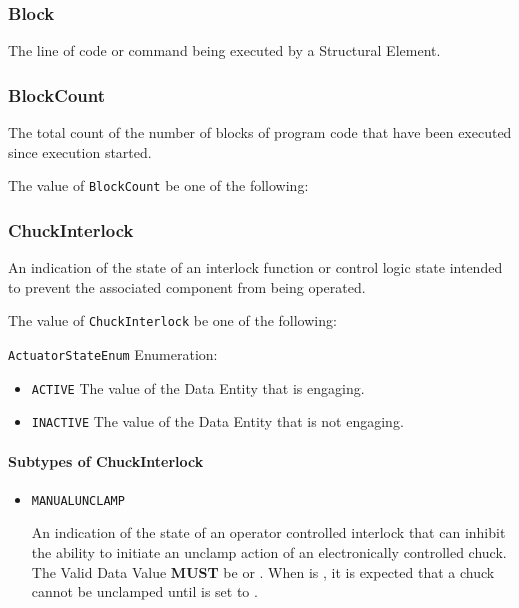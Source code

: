 \subsubsection{Block}
\label{sec:Block}



The line of code or command being executed by a  \gls{Structural Element}.


\subsubsection{BlockCount}
\label{sec:BlockCount}



The total count of the number of blocks of program code that have been executed since execution started.


The value of \texttt{BlockCount} \MUST be one of the following: 

\FloatBarrier

\subsubsection{ChuckInterlock}




An indication of the state of an interlock function or control logic state intended to prevent the associated  component from being operated.


The value of \texttt{ChuckInterlock} \MUST be one of the following: 


\texttt{ActuatorStateEnum} Enumeration:

\begin{itemize}
\item \texttt{ACTIVE} \newline The value of the \gls{Data Entity} that is engaging. 
\item \texttt{INACTIVE} \newline The value of the \gls{Data Entity} that is not engaging. 
\end{itemize}

\FloatBarrier

\paragraph{Subtypes of ChuckInterlock}\mbox{}
\label{sec:Subtypes of ChuckInterlock}

\begin{itemize}

\item \texttt{MANUAL\textunderscore UNCLAMP}


An indication of the state of an operator controlled interlock that can inhibit the ability to initiate an unclamp action of an electronically controlled chuck.
 The \gls{Valid Data Value} \textbf{MUST} be  or . 
 When  is , it is expected that a chuck cannot be unclamped until  is set to . 


\end{itemize}

